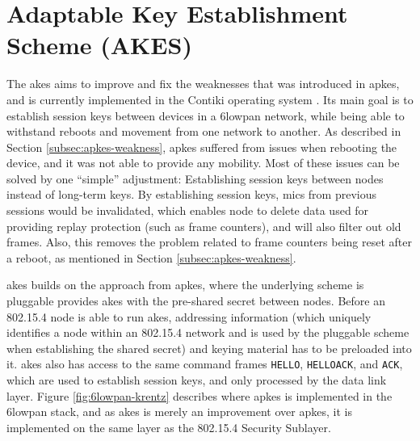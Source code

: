 \section{Adaptable Key Establishment Scheme (AKES)}

The \gls{akes} aims to improve and fix the weaknesses that was introduced in \gls{apkes}, and is currently implemented in the Contiki operating system \cite{krentz2015handling}. Its main goal is to establish session keys between devices in a \gls{6lowpan} network, while being able to withstand reboots and movement from one network to another. As described in Section \ref{subsec:apkes-weakness}, \gls{apkes} suffered from issues when rebooting the device, and it was not able to provide any mobility. Most of these issues can be solved by one ``simple'' adjustment: Establishing session keys between nodes instead of long-term keys. By establishing session keys, \gls{mic}s from previous sessions would be invalidated, which enables node to delete data used for providing replay protection (such as frame counters), and will also filter out old frames. Also, this removes the problem related to frame counters being reset after a reboot, as mentioned in Section \ref{subsec:apkes-weakness}. 

\gls{akes} builds on the approach from \gls{apkes}, where the underlying scheme is pluggable provides \gls{akes} with the pre-shared secret between nodes. Before an 802.15.4 node is able to run \gls{akes}, addressing information (which uniquely identifies a node within an 802.15.4 network and is used by the pluggable scheme when establishing the shared secret) and keying material has to be preloaded into it. \gls{akes} also has access to the same command frames \texttt{HELLO}, \texttt{HELLOACK}, and \texttt{ACK}, which are used to establish session keys, and only processed by the data link layer. Figure \ref{fig:6lowpan-krentz} describes where \gls{apkes} is implemented in the \gls{6lowpan} stack, and as \gls{akes} is merely an improvement over \gls{apkes}, it is implemented on the same layer as the 802.15.4 Security Sublayer. 

